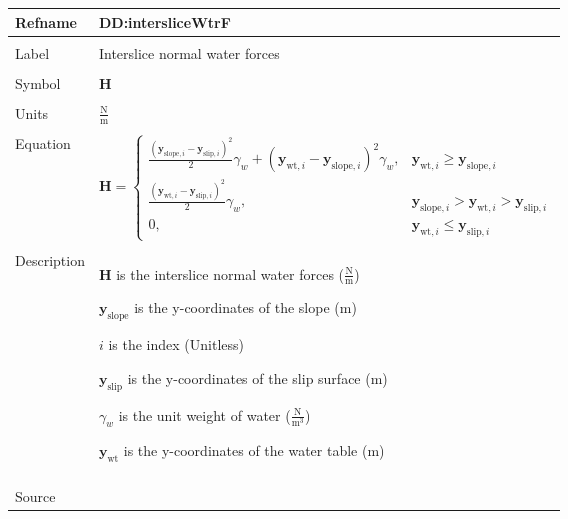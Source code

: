 \documentclass[12pt]{article}
\begin{document}
\vspace{\baselineskip}
\noindent
\begin{minipage}{\textwidth}
\begin{tabular}{>{\raggedright}p{}>{\raggedright\arraybackslash}p{}}
\toprule \textbf{Refname} & \textbf{DD:intersliceWtrF}
\label{DD:intersliceWtrF}
\\ \midrule \\
Label & Interslice normal water forces
        
\\ \midrule \\
Symbol & $\mathbf{H}$
         
\\ \midrule \\
Units & $\frac{\text{N}}{\text{m}}$
        
\\ \midrule \\
Equation & \begin{displaymath}
           \mathbf{H}=\begin{cases}
                      \frac{\left({\mathbf{y}_{\text{slope},i}}-{\mathbf{y}_{\text{slip},i}}\right)^{2}}{2} {γ_{w}}+\left({\mathbf{y}_{\text{wt},i}}-{\mathbf{y}_{\text{slope},i}}\right)^{2} {γ_{w}}, & {\mathbf{y}_{\text{wt},i}}\geq{}{\mathbf{y}_{\text{slope},i}}\\
                      \frac{\left({\mathbf{y}_{\text{wt},i}}-{\mathbf{y}_{\text{slip},i}}\right)^{2}}{2} {γ_{w}}, & {\mathbf{y}_{\text{slope},i}}>{\mathbf{y}_{\text{wt},i}}>{\mathbf{y}_{\text{slip},i}}\\
                      0, & {\mathbf{y}_{\text{wt},i}}\leq{}{\mathbf{y}_{\text{slip},i}}
                      \end{cases}
           \end{displaymath}
\\ \midrule \\
Description & \begin{symbDescription}
              \item{$\mathbf{H}$ is the interslice normal water forces ($\frac{\text{N}}{\text{m}}$)}
              \item{${\mathbf{y}_{\text{slope}}}$ is the y-coordinates of the slope (m)}
              \item{$i$ is the index (Unitless)}
              \item{${\mathbf{y}_{\text{slip}}}$ is the y-coordinates of the slip surface (m)}
              \item{${γ_{w}}$ is the unit weight of water ($\frac{\text{N}}{\text{m}^{3}}$)}
              \item{${\mathbf{y}_{\text{wt}}}$ is the y-coordinates of the water table (m)}
              \end{symbDescription}
\\ \midrule \\
Source & \cite{fredlund1977}
         

\end{tabular}
\end{minipage}
\end{document}
